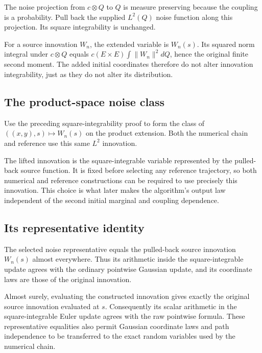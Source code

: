 \documentclass[11pt,a4paper]{article}
\begin{document}
The noise projection from \(c\otimes Q\) to \(Q\) is measure preserving because the coupling is a probability. Pull back the supplied \(L^2(Q)\) noise function along this projection. Its square integrability is unchanged.



For a source innovation \(W_n\), the extended variable is \(W_n(s)\). Its squared norm integral under \(c\otimes Q\) equals \(c(E\times E)\int\|W_n\|^2dQ\), hence the original finite second moment. The added initial coordinates therefore do not alter innovation integrability, just as they do not alter its distribution.


\subsection{\texorpdfstring{The product-space noise class}{The product-space noise class}}


Use the preceding square-integrability proof to form the class of \(((x,y),s)\mapsto W_n(s)\) on the product extension. Both the numerical chain and reference use this same \(L^2\) innovation.



The lifted innovation is the square-integrable variable represented by the pulled-back source function. It is fixed before selecting any reference trajectory, so both numerical and reference constructions can be required to use precisely this innovation. This choice is what later makes the algorithm's output law independent of the second initial marginal and coupling dependence.


\subsection{\texorpdfstring{Its representative identity}{Its representative identity}}


The selected noise representative equals the pulled-back source innovation \(W_n(s)\) almost everywhere. Thus its arithmetic inside the square-integrable update agrees with the ordinary pointwise Gaussian update, and its coordinate laws are those of the original innovation.



Almost surely, evaluating the constructed innovation gives exactly the original source innovation evaluated at \(s\). Consequently its scalar arithmetic in the square-integrable Euler update agrees with the raw pointwise formula. These representative equalities also permit Gaussian coordinate laws and path independence to be transferred to the exact random variables used by the numerical chain.
\end{document}
